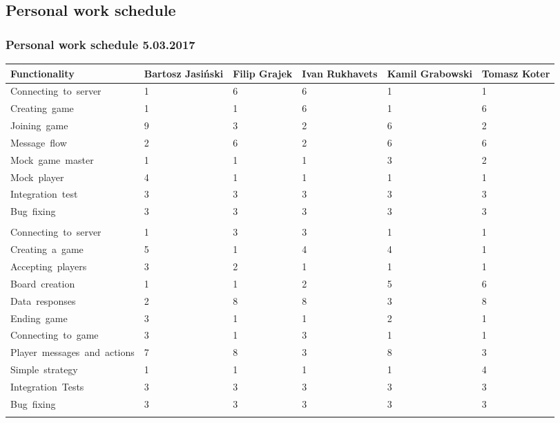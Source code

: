 \documentclass[11pt,a4paper]{article}
\begin{document}

\subsection{Personal work schedule}

\subsubsection{Personal work schedule 5.03.2017}

\begin{tabular}{ | p{4cm} | p{2cm} | p{2cm} | p{2cm} | p{2cm} | p{2cm} | }
\hline
	\textbf{Functionality} & \textbf{Bartosz Jasiński} & \textbf{Filip Grajek} & \textbf{Ivan Rukhavets} & \textbf{Kamil Grabowski} & \textbf{Tomasz Koter}\\ \hline
	Connecting\ to\ server & 1 & 6 & 6 & 1 & 1   \\ \hline
	Creating\ game & 1 & 1 & 6 & 1 & 6   \\ \hline
	Joining\ game & 9 & 3 & 2 & 6 & 2   \\ \hline
	Message\ flow & 2 & 6 & 2 & 6 & 6   \\ \hline
	Mock\ game\ master & 1 & 1 & 1 & 3 & 2   \\ \hline
	Mock\ player & 4 & 1 & 1 & 1 & 1   \\ \hline
	Integration\ test & 3 & 3 & 3 & 3 & 3   \\ \hline
	Bug\ fixing & 3 & 3 & 3 & 3 & 3  \\ \hline
	 &  &  &  &  &   \\ \hline

	Connecting\ to\ server & 1 & 3 & 3 & 1 & 1    \\ \hline
	Creating\ a\ game & 5 & 1 & 4 & 4 & 1   \\ \hline
	Accepting\ players & 3 & 2 & 1 & 1 & 1   \\ \hline
	Board\ creation & 1 & 1 & 2 & 5 & 6    \\ \hline
	Data\ responses & 2 & 8 & 8 & 3 & 8   \\ \hline
	Ending\ game & 3 & 1 & 1 & 2 & 1   \\ \hline
	Connecting\ to\ game & 3 & 1 & 3 & 1 & 1   \\ \hline
	Player\ messages\ and\ actions & 7 & 8 & 3 & 8 & 3\  \\ \hline
	Simple\ strategy & 1 & 1 & 1 & 1 & 4   \\ \hline
	Integration\ Tests & 3 & 3 & 3 & 3 & 3   \\ \hline
	Bug\ fixing & 3 & 3 & 3 & 3 & 3   \\ \hline
	 &  &  &  &  &  \\ \hline
	

\end{tabular}
\end{document}
